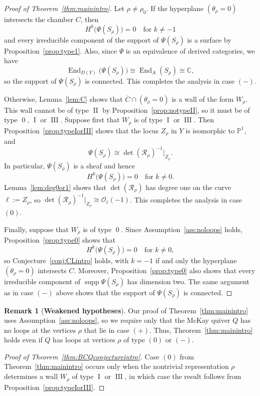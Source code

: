 \documentclass[11pt,reqno]{amsart}
\numberwithin{equation}{section}
\theoremstyle{definition}
\newtheorem{remark}[theorem]{Remark}
\newcommand{\CC}{\ensuremath{\mathbb{C}}}
\newcommand{\End}{\operatorname{End}}
\newcommand{\0}{\operatorname{0}}
\newcommand{\I}{\operatorname{I}}
\newcommand{\II}{\operatorname{II}}
\newcommand{\III}{\operatorname{III}}
\newcommand{\supp}{\operatorname{supp}}
\begin{document}
\begin{proof}[Proof of Theorem~\ref{thm:mainintro}]
Let $\rho\neq \rho_0$. If the hyperplane $(\theta_\rho=0)$ intersects the chamber $C$, then 
 \[
 H^k\big(\Psi(S_\rho)\big)=0 \quad\text{for }k\neq -1
 \]
 and every irreducible component of the support of $\Psi(S_\rho)$ is a surface by Proposition~\ref{prop:type1}. Also, since $\Psi$ is an equivalence of derived categories, we have
 \[
 \End_{D(Y)}\big(\Psi(S_\rho)\big) \cong \End_A(S_\rho) \cong \CC,
 \]
 so the support of $\Psi(S_\rho)$ is connected. This completes the analysis in case \ensuremath{(-)}.

 Otherwise, Lemma~\ref{lem:C} shows that $\overline{C}\cap (\theta_\rho=0)$ is a wall of the form $W_\rho$. This wall cannot be of type $\II$ by Proposition~\ref{prop:notypeII}, so it must be of type $\0$, $\I$ or $\III$. Suppose first that $W_\rho$ is of type $\I$ or $\III$. Then Proposition~\ref{prop:typeIorIII} shows that the locus $Z_\rho$ in $Y$ is isomorphic to $\mathbb{P}^1$, and
  \[
 \Psi(S_\rho) \cong \det(\mathcal{R}_\rho)^{-1}\vert_{Z_\rho}.
 \]
 In particular, $\Psi(S_\rho)$ is a sheaf and hence 
 \[
 H^k\big(\Psi(S_\rho)\big)=0\quad \text{for }k\neq 0.
 \]
 Lemma~\ref{lem:deg0or1} shows that $\det(\mathcal{R}_\rho)$ has degree one on the curve $\ell:= Z_\rho$, so $\det(\mathcal{R}_\rho)^{-1}\vert_{Z_\rho}\cong \mathcal{O}_{\ell}(-1)$. This completes the analysis in case \ensuremath{(0)}. 
 
 Finally, suppose that $W_\rho$ is of type $\0$. Since Assumption~\ref{ass:noloops} holds, Proposition~\ref{prop:type0} shows that 
  \[
 H^k\big(\Psi(S_\rho)\big)=0 \quad\text{for }k\neq 0,
 \]
 so Conjecture~\ref{conj:CLintro} holds, with $k=-1$ if and only the hyperplane $(\theta_\rho=0)$ intersects $C$. 
 Moreover, Proposition~\ref{prop:type0} also shows that every irreducible component of $\supp\Psi(S_\rho)$ has dimension two. The same argument as in case \ensuremath{(-)} above shows that the support of $\Psi(S_\rho)$ is connected.
\end{proof}

 \begin{remark}[\textbf{Weakened hypotheses}]
 \label{rem:weakened}
     Our proof of Theorem~\ref{thm:mainintro} uses Assumption~\ref{ass:noloops}, so we require only that the McKay quiver $Q$ has no loops at the vertices $\rho$ that lie in case  \ensuremath{(+)}. Thus, Theorem~\ref{thm:mainintro} holds even if $Q$ has loops at vertices $\rho$ of type \ensuremath{(0)} or \ensuremath{(-)}.
 \end{remark}
 \begin{proof}[Proof of Theorem~\ref{thm:BCQconjectureintro}]
  Case \ensuremath{(0)} from Theorem~\ref{thm:mainintro} occurs only when the nontrivial representation $\rho$ determines a wall $W_\rho$ of type $\I$ or $\III$, in which case the result follows from Proposition~\ref{prop:typeIorIII}.
  \end{proof}
 
\end{document}
